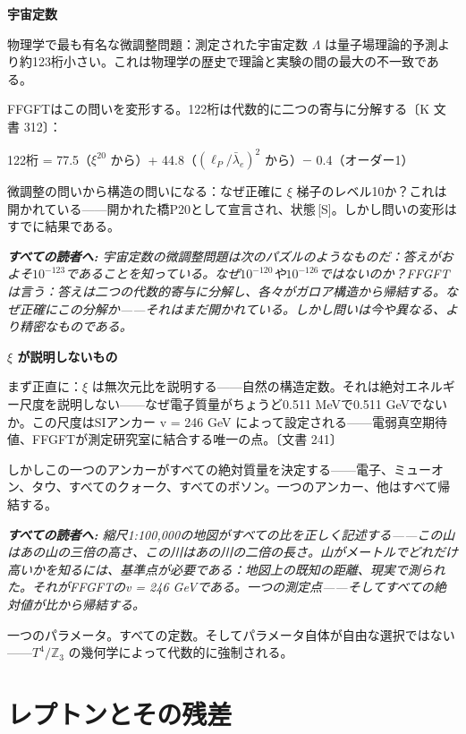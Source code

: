 \documentclass[11pt,openany]{book}
\newcommand{\status}[1]{\penalty10000\,{\tiny\textcolor{gray!70}{[#1]}}}
\newenvironment{laierspur}{%
  \par\vspace{4pt}%
  \noindent\small\itshape\color{blue!60!black}%
  \textbf{すべての読者へ:}\enspace\ignorespaces}{%
  \par\vspace{4pt}\normalsize\normalfont\normalcolor}
\begin{document}
\textbf{宇宙定数}

物理学で最も有名な微調整問題：測定された宇宙定数 $\Lambda$ は量子場理論的予測より約123桁小さい。これは物理学の歴史で理論と実験の間の最大の不一致である。

FFGFTはこの問いを変形する。122桁は代数的に二つの寄与に分解する〔K 文書 312〕：

122桁 = 77.5（$\xi^{20}$ から）+ 44.8（$(\ell_P/\bar{\lambda}_e)^2$ から）$-$ 0.4（オーダー1）

微調整の問いから構造の問いになる：なぜ正確に $\xi$ 梯子のレベル10か？これは開かれている——開かれた橋P20として宣言され、状態\status{S}。しかし問いの変形はすでに結果である。

\begin{laierspur}
宇宙定数の微調整問題は次のパズルのようなものだ：答えがおよそ$10^{-123}$であることを知っている。なぜ$10^{-120}$や$10^{-126}$ではないのか？FFGFTは言う：答えは二つの代数的寄与に分解し、各々がガロア構造から帰結する。なぜ正確にこの分解か——それはまだ開かれている。しかし問いは今や異なる、より精密なものである。
\end{laierspur}

\textbf{$\xi$ が説明しないもの}

まず正直に：$\xi$ は無次元比を説明する——自然の構造定数。それは絶対エネルギー尺度を説明しない——なぜ電子質量がちょうど0.511 MeVで0.511 GeVでないか。この尺度はSIアンカー v = 246 GeV によって設定される——電弱真空期待値、FFGFTが測定研究室に結合する唯一の点。〔文書 241〕

しかしこの一つのアンカーがすべての絶対質量を決定する——電子、ミューオン、タウ、すべてのクォーク、すべてのボソン。一つのアンカー、他はすべて帰結する。

\begin{laierspur}
縮尺1:100,000の地図がすべての比を正しく記述する——この山はあの山の三倍の高さ、この川はあの川の二倍の長さ。山がメートルでどれだけ高いかを知るには、基準点が必要である：地図上の既知の距離、現実で測られた。それがFFGFTのv = 246 GeVである。一つの測定点——そしてすべての絶対値が比から帰結する。
\end{laierspur}

一つのパラメータ。すべての定数。そしてパラメータ自体が自由な選択ではない——$T^4/\mathbb{Z}_3$ の幾何学によって代数的に強制される。

\medskip

\chapter{レプトンとその残差}
\end{document}

